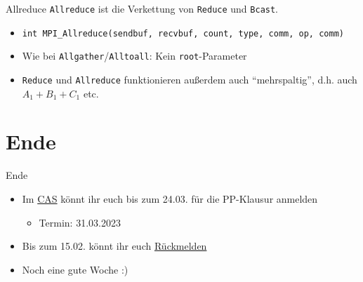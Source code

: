 \documentclass{beamer}
\begin{document}
\begin{frame}{Allreduce}
	\texttt{Allreduce} ist die Verkettung von \texttt{Reduce} und \texttt{Bcast}.

	\begin{figure}
	\end{figure}

	\begin{itemize}
		\item {\footnotesize \texttt{int MPI\_Allreduce(sendbuf, recvbuf, count, type, comm, op, comm)}}
                \item Wie bei \texttt{Allgather}/\texttt{Alltoall}: Kein \texttt{root}-Parameter
                \item \texttt{Reduce} und \texttt{Allreduce} funktionieren außerdem auch \enquote{mehrspaltig}, d.h. auch $A_1 + B_1 + C_1$ etc.
	\end{itemize}
\end{frame}

\section{Ende}

\begin{frame}{Ende}
	\begin{itemize}
		\item Im \href{https://campus.studium.kit.edu/exams/registration.php?pguid=0x87BA4E33FD4947E8ADAB43370BDFA852}{CAS} könnt ihr euch bis zum 24.03. für die PP-Klausur anmelden
		\begin{itemize}
			\item Termin: 31.03.2023
		\end{itemize}
		\item Bis zum 15.02. könnt ihr euch \href{https://campus.studium.kit.edu/renewal/payment.php}{Rückmelden}
		\item Noch eine gute Woche :)
	\end{itemize}
\end{frame}
\end{document}
